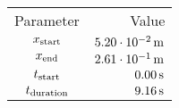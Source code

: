 \begin{tabular}{cr}
    \toprule
    Parameter & Value \\ \otoprule
    $x_{\textup{start}}$    & $\unit[5.20 \cdot 10^{-2}]{m}$ \\
    $x_{\textup{end}}$      & $\unit[2.61 \cdot 10^{-1}]{m}$ \\
    $t_{\textup{start}}$    & $\unit[0.00]{s}$ \\
    $t_{\textup{duration}}$ & $\unit[9.16]{s}$ \\
    \bottomrule
\end{tabular}
